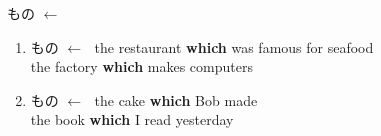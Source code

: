 \documentclass[aspectratio=169,xcolor={dvipsnames,table}]{beamer}
\begin{document}
\begin{frame}[plain,t]{もの $\leftarrow$ }
\begin{block}
\begin{enumerate}\small
 \item もの\,\,$\longleftarrow$\,\,%
\hfill{\scriptsize the restaurant \textbf{which} was famous for seafood}\\
\hfill{\scriptsize the factory \textbf{which} makes computers}
 \item もの\,\,$\longleftarrow$\,\,%
\hfill{\scriptsize the cake \textbf{which} Bob made}\\
\hfill{\scriptsize the book \textbf{which} I read yesterday}
 \end{enumerate}
     \end{block}

\end{frame}
\end{document}
